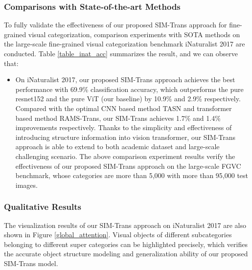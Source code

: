\documentclass[sigconf, nonacm]{acmart}
\begin{document}
\subsubsection{ \textbf{Comparisons with State-of-the-art Methods }}

To fully validate the effectiveness of our proposed SIM-Trans approach for fine-grained visual categorization, comparison experiments with SOTA methods on the large-scale fine-grained visual categorization benchmark iNaturalist 2017 are conducted. Table \ref{table_inat_acc} summarizes the result, and we can observe that:
\begin{itemize}[leftmargin=30pt]
\item {On iNaturalist 2017, our proposed SIM-Trans approach achieves the best performance with 69.9\% classification accuracy, which outperforms the pure resnet152 and the pure ViT (our baseline) by 10.9\% and 2.9\% respectively. Compared with the optimal CNN based method TASN and transformer based method RAMS-Trans, our SIM-Trans achieves 1.7\% and 1.4\% improvements respectively. Thanks to the simplicity and effectiveness of introducing structure information into vision transformer, our SIM-Trans approach is able to extend to both academic dataset and large-scale challenging scenario. The above comparison experiment results verify the effectiveness of our proposed SIM-Trans approach on the large-scale FGVC benchmark, whose categories are more than 5,000 with more than 95,000 test images.
} 

\end{itemize}



\subsubsection{\textbf{Qualitative Results }}

The visualization results of our SIM-Trans approach on iNaturalist 2017 are also shown in Figure \ref{global_attention}. Visual objects of different subcategories belonging to different super categories can be highlighted precisely, which verifies the accurate object structure modeling and generalization ability of our proposed SIM-Trans model.
\end{document}
